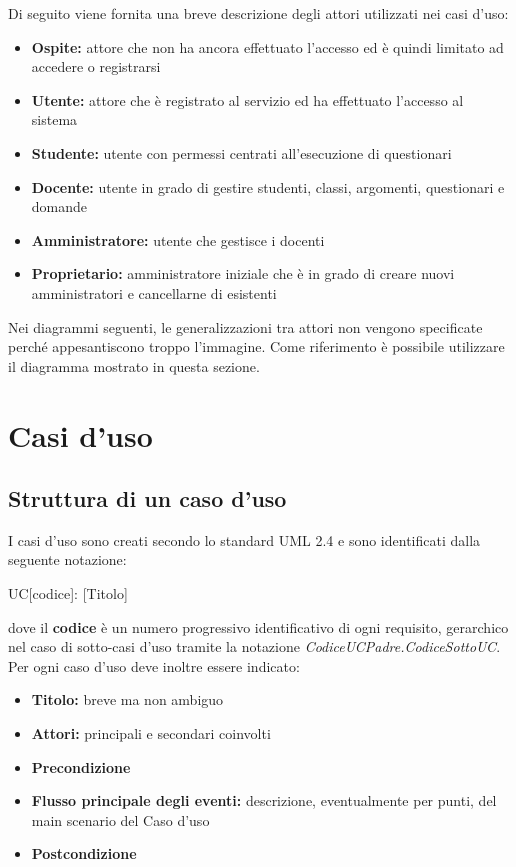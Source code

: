 \documentclass[12pt,a4paper]{article}
\begin{document}
Di seguito viene fornita una breve descrizione degli attori utilizzati nei casi d'uso:

\begin{itemize}
    \item \textbf{Ospite:} attore che non ha ancora effettuato l'accesso ed è quindi limitato
        ad accedere o registrarsi
    \item \textbf{Utente:} attore che è registrato al servizio ed ha effettuato l'accesso al
        sistema
    \item \textbf{Studente:} utente con permessi centrati all'esecuzione di
        questionari
    \item \textbf{Docente:} utente in grado di gestire studenti, classi, argomenti, questionari
        e domande
    \item \textbf{Amministratore:} utente che gestisce i docenti
    \item \textbf{Proprietario:} amministratore iniziale che è in grado di creare nuovi amministratori
        e cancellarne di esistenti
\end{itemize}

Nei diagrammi seguenti, le generalizzazioni tra attori non vengono specificate perché
appesantiscono troppo l'immagine. Come riferimento è possibile utilizzare il diagramma mostrato in questa
sezione.

\newpage
\section{Casi d'uso}

\subsection{Struttura di un caso d'uso}
I casi d'uso sono creati secondo lo standard UML 2.4 e sono identificati dalla seguente notazione:
\begin{center}
	UC[codice]: [Titolo]
\end{center}
dove il \textbf{codice} è un numero progressivo identificativo di ogni requisito, gerarchico nel  caso di sotto-casi d'uso tramite la notazione \textit{CodiceUCPadre.CodiceSottoUC}. Per ogni caso d'uso deve inoltre essere indicato:
\begin{itemize}
	\item \textbf{Titolo:} breve ma non ambiguo
	\item \textbf{Attori:} principali e secondari coinvolti
	\item \textbf{Precondizione}
	\item \textbf{Flusso principale degli eventi:} descrizione, eventualmente per punti, del main scenario del Caso d'uso
	\item \textbf{Postcondizione}
\end{itemize}
\end{document}
